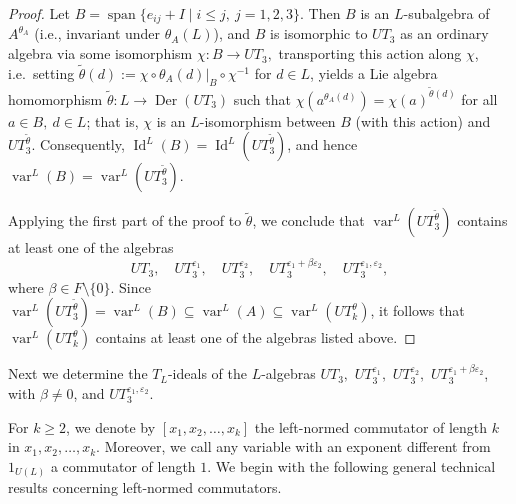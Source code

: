 \documentclass[a4paper,reqno]{amsart}
\theoremstyle{definition}
\numberwithin{equation}{section}
\numberwithin{theorem}{section}
\DeclareMathOperator{\I}{Id}
\DeclareMathOperator{\V}{var}
\DeclareMathOperator{\spn}{span}
\DeclareMathOperator{\D}{Der}
\begin{document}
\begin{proof}
Let $B=\spn\{e_{ij}+I\mid i\le j,\ j=1,2,3\}$. Then $B$ is an $L$-subalgebra of $A^{\theta_A}$ (i.e., invariant
under $\theta_A(L)$), and $B$ is isomorphic to $UT_3$ as an ordinary algebra via some isomorphism
$\chi:B\to UT_3,$ transporting this action along $\chi$, i.e.\ setting
$\tilde\theta(d):=\chi\circ\theta_A(d)|_B\circ\chi^{-1}$ for $d\in L$, yields a Lie algebra
homomorphism $\tilde\theta:L\to\D(UT_3)$ such that $\chi(a^{\theta_A(d)})=\chi(a)^{\tilde\theta(d)}$
for all $a\in B,\ d\in L$; that is, $\chi$ is an $L$-isomorphism between $B$ (with this action) and
$UT_3^{\tilde\theta}$. Consequently, $\I^L(B)=\I^L(UT_3^{\tilde\theta})$, and hence
$\V^L(B)=\V^L(UT_3^{\tilde\theta})$.

Applying the first part of the proof to $\tilde\theta$, we conclude that $\V^L(UT_3^{\tilde\theta})$
contains at least one of the algebras
$$
UT_3,\quad UT_3^{\varepsilon_1},\quad UT_3^{\varepsilon_2},\quad
UT_3^{\varepsilon_1+\beta\varepsilon_2},\quad UT_3^{\varepsilon_1,\varepsilon_2},
$$
where $\beta\in F\setminus\{0\}$.  Since $\V^L(UT_3^{\tilde\theta})=\V^L(B)\subseteq\V^L(A)\subseteq
\V^L(UT_k^\theta)$, it follows that $\V^L(UT_k^\theta)$ contains at least one of the algebras
listed above.
\end{proof}


Next we determine the $T_L$-ideals of the $L$-algebras $UT_3,$ $UT_3^{\varepsilon_1},$ $UT_3^{\varepsilon_2},$ $UT_3^{\varepsilon_1+\beta \varepsilon_2}$, with $\beta \neq 0$, and $UT_3^{\varepsilon_1, \varepsilon_2}$.



For $k\geq 2$, we denote by $[x_1,x_2,\ldots, x_k]$ the left-normed commutator of length $k$ in $x_1,x_2,\ldots, x_k$. Moreover, we call any variable with an exponent different from $1_{U(L)}$ a commutator of length $1$.  We begin with the following general technical results concerning left-normed commutators.
\end{document}
